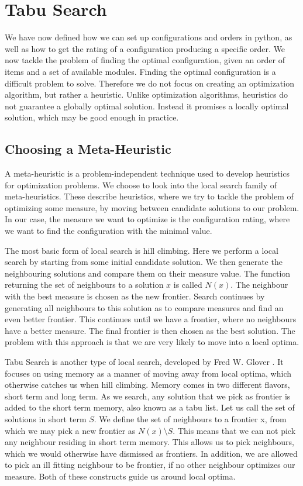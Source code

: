 \section{Tabu Search}
We have now defined how we can set up configurations and orders in python, as well as how to get the rating of a configuration producing a specific order. We now tackle the problem of finding the optimal configuration, given an order of items and a set of available modules. Finding the optimal configuration is a difficult problem to solve. Therefore we do not focus on creating an optimization algorithm, but rather a heuristic. Unlike optimization algorithms, heuristics do not guarantee a globally optimal solution. Instead it promises a locally optimal solution, which may be good enough in practice.

\subsection{Choosing a Meta-Heuristic}
A meta-heuristic is a problem-independent technique used to develop heuristics for optimization problems. We choose to look into the local search family of meta-heuristics. These describe heuristics, where we try to tackle the problem of optimizing some measure, by moving between candidate solutions to our problem. In our case, the measure we want to optimize is the configuration rating, where we want to find the configuration with the minimal value.

The most basic form of local search is hill climbing. Here we perform a local search by starting from some initial candidate solution. We then generate the neighbouring solutions and compare them on their measure value. The function returning the set of neighbours to a solution $x$ is called $N(x)$. The neighbour with the best measure is chosen as the new frontier. Search continues by generating all neighbours to this solution as to compare measures and find an even better frontier. This continues until we have a frontier, where no neighbours have a better measure. The final frontier is then chosen as the best solution. The problem with this approach is that we are very likely to move into a local optima. 

Tabu Search is another type of local search, developed by Fred W. Glover \cite{glover2006}. It focuses on using memory as a manner of moving away from local optima, which otherwise catches us when hill climbing. Memory comes in two different flavors, short term and long term. As we search, any solution that we pick as frontier is added to the short term memory, also known as a tabu list. Let us call the set of solutions in short term $S$. We define the set of neighbours to a frontier x, from which we may pick a new frontier as $N(x) \setminus S$. This means that we can not pick any neighbour residing in short term memory. This allows us to pick neighbours, which we would otherwise have dismissed as frontiers. In addition, we are allowed to pick an ill fitting neighbour to be frontier, if no other neighbour optimizes our measure. Both of these constructs guide us around local optima.

